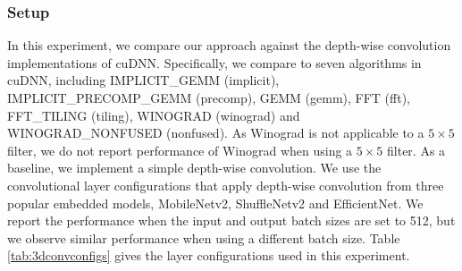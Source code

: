 \subsubsection{Setup} In this experiment, we compare our approach against the depth-wise
convolution implementations of cuDNN. Specifically, we compare to seven algorithms in cuDNN, including IMPLICIT\_GEMM (implicit),
IMPLICIT\_PRECOMP\_GEMM (precomp), GEMM (gemm), FFT (fft), FFT\_TILING (tiling), WINOGRAD (winograd) and WINOGRAD\_NONFUSED (nonfused). As
Winograd is not applicable  to a $5 \times 5$ filter, we do not report performance of Winograd when using a $5 \times 5$ filter. As a
baseline, we implement a simple depth-wise convolution. We use the convolutional layer configurations that apply depth-wise convolution
from three popular embedded models, MobileNetv2, ShuffleNetv2 and EfficientNet. We report the performance when the input and output batch
sizes are set to 512, but we observe similar performance when using a different batch size. Table \ref{tab:3dconvconfigs} gives the layer
configurations used in this experiment.






